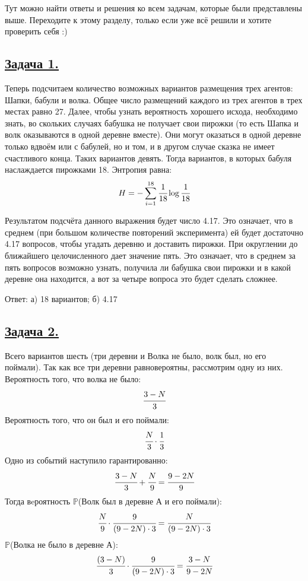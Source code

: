 Тут можно найти ответы и решения ко всем задачам, которые были представлены выше. Переходите к этому разделу, только если уже всё решили и хотите проверить себя :)

\subsection*{\hyperref[sec:problem1]{Задача 1.}}\label{sec:sol_problem1}
Теперь подсчитаем количество возможных вариантов размещения трех агентов: Шапки, бабули и волка. Общее число размещений каждого из трех агентов в трех местах равно 27. 
Далее, чтобы узнать вероятность хорошего исхода, необходимо знать, во скольких случаях бабушка не получает свои пирожки (то есть Шапка и волк оказываются в одной деревне вместе). Они могут оказаться в одной деревне только вдвоём или с бабулей, но и том, и в другом случае сказка не имеет счастливого конца. Таких вариантов девять. Тогда вариантов, в которых бабуля наслаждается пирожками 18.
Энтропия равна:
\[H=-\sum\limits_{i=1}^{18}  \cfrac{1}{18}\log \cfrac{1}{18} \]

Результатом подсчёта данного выражения будет число 4.17. Это означает, что в среднем (при большом количестве повторений эксперимента) ей будет достаточно 4.17 вопросов, чтобы угадать деревню и доставить пирожки. При округлении до ближайшего целочисленного дает значение пять. Это означает, что в среднем за пять вопросов возможно узнать, получила ли бабушка свои пирожки и в какой деревне она находится, а вот за четыре вопроса это будет сделать сложнее. 

Ответ: а) 18 вариантов; б) 4.17


\subsection*{\hyperref[sec:problem2]{Задача 2.}}\label{sec:sol_problem2}

Всего вариантов шесть (три деревни и Волка не было, волк был, но его поймали). Так как все три деревни равновероятны, рассмотрим одну из них. Вероятность того, что волка не было: \[\cfrac{3-N}{3} \]
Вероятность того, что он был и его поймали: \[\cfrac{N}{3}\cdot \cfrac{1}{3} \]
Одно из событий наступило гарантированно: 
\[\cfrac{3-N}{3} + \cfrac{N}{9} = \cfrac{9-2N}{9} \]
Тогда вeроятность $\mathbb{P}$(Волк был в деревне А и его поймали):
\[\cfrac{N}{9}\cdot \cfrac{9}{(9-2N)\cdot3} =\cfrac{N}{(9-2N)\cdot3} \] 
$\mathbb{P}$(Волка не было в деревне А):
\[\cfrac{(3-N)}{3}\cdot \cfrac{9}{(9-2N)\cdot3}=\cfrac{3-N}{9-2N}\]

